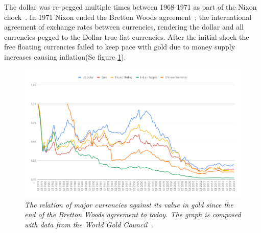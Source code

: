 The dollar was re-pegged multiple times between 1968-1971 as part of the Nixon chock~\cite{bordo:bretton:woods}. In 1971 Nixon ended the Bretton Woods agreement~\cite{bordo:bretton:woods}; the international agreement of exchange rates between currencies, rendering the dollar and all currencies pegged to the Dollar true fiat currencies. After the initial shock the free floating currencies failed to keep pace with gold due to money supply increases causing inflation(Se figure \ref{fig:gold:price:major:currency}).

\begin{figure}[!htb]
	\centering
	\includegraphics[width=16cm]{external/gold-price.png}
	\caption{\textit{The relation of major currencies against its value in gold since the end of the Bretton Woods agreement to
			today. The graph is composed with data from the World Gold Council~\cite{world:gold:council}. 
	}}
	\label{fig:gold:price:major:currency}
\end{figure}

